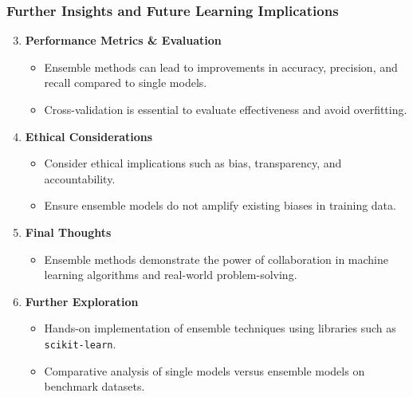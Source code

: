 \documentclass[aspectratio=169]{beamer}
\begin{document}
\begin{frame}[fragile]
    \frametitle{Further Insights and Future Learning Implications}
    \begin{enumerate}
        \setcounter{enumi}{2}
        \item \textbf{Performance Metrics \& Evaluation}
        \begin{itemize}
            \item Ensemble methods can lead to improvements in accuracy, precision, and recall compared to single models.
            \item Cross-validation is essential to evaluate effectiveness and avoid overfitting.
        \end{itemize}
        
        \item \textbf{Ethical Considerations}
        \begin{itemize}
            \item Consider ethical implications such as bias, transparency, and accountability.
            \item Ensure ensemble models do not amplify existing biases in training data.
        \end{itemize}
        
        \item \textbf{Final Thoughts}
        \begin{itemize}
            \item Ensemble methods demonstrate the power of collaboration in machine learning algorithms and real-world problem-solving.
        \end{itemize}
        
        \item \textbf{Further Exploration}
        \begin{itemize}
            \item Hands-on implementation of ensemble techniques using libraries such as \texttt{scikit-learn}.
            \item Comparative analysis of single models versus ensemble models on benchmark datasets.
        \end{itemize}
    \end{enumerate}
\end{frame}
\end{document}

